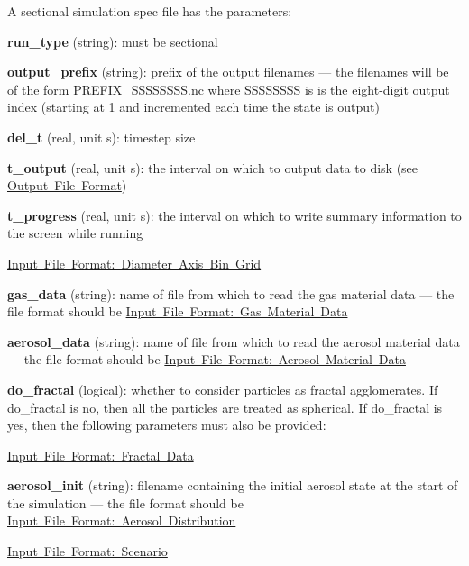 A sectional simulation spec file has the parameters\+:
\begin{DoxyItemize}
\item {\bfseries run\+\_\+type} (string)\+: must be {\ttfamily sectional} 
\item {\bfseries output\+\_\+prefix} (string)\+: prefix of the output filenames --- the filenames will be of the form {\ttfamily P\+R\+E\+F\+I\+X\+\_\+\+S\+S\+S\+S\+S\+S\+S\+S.\+nc} where {\ttfamily S\+S\+S\+S\+S\+S\+SS} is is the eight-\/digit output index (starting at 1 and incremented each time the state is output)
\item {\bfseries del\+\_\+t} (real, unit s)\+: timestep size
\item {\bfseries t\+\_\+output} (real, unit s)\+: the interval on which to output data to disk (see \mbox{\hyperlink{output_format}{Output File Format}})
\item {\bfseries t\+\_\+progress} (real, unit s)\+: the interval on which to write summary information to the screen while running
\item \mbox{\hyperlink{input_format_diam_bin_grid}{Input File Format\+: Diameter Axis Bin Grid}}
\item {\bfseries gas\+\_\+data} (string)\+: name of file from which to read the gas material data --- the file format should be \mbox{\hyperlink{input_format_gas_data}{Input File Format\+: Gas Material Data}}
\item {\bfseries aerosol\+\_\+data} (string)\+: name of file from which to read the aerosol material data --- the file format should be \mbox{\hyperlink{input_format_aero_data}{Input File Format\+: Aerosol Material Data}}
\item {\bfseries do\+\_\+fractal} (logical)\+: whether to consider particles as fractal agglomerates. If {\ttfamily do\+\_\+fractal} is {\ttfamily no}, then all the particles are treated as spherical. If {\ttfamily do\+\_\+fractal} is {\ttfamily yes}, then the following parameters must also be provided\+:
\begin{DoxyItemize}
\item \mbox{\hyperlink{input_format_fractal}{Input File Format\+: Fractal Data}}
\end{DoxyItemize}
\item {\bfseries aerosol\+\_\+init} (string)\+: filename containing the initial aerosol state at the start of the simulation --- the file format should be \mbox{\hyperlink{input_format_aero_dist}{Input File Format\+: Aerosol Distribution}}
\item \mbox{\hyperlink{input_format_scenario}{Input File Format\+: Scenario}}

\end{DoxyItemize}
